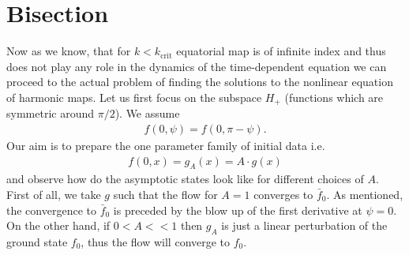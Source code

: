\section*{Bisection}

Now as we know, that for $k<k_{\text{crit}}$ equatorial map is of infinite
index and thus does not play any role in the dynamics of the
time-dependent equation we can proceed to the actual problem of
finding the solutions to the nonlinear equation of harmonic maps. Let
us first focus on the subspace $H_+$ (functions which are symmetric around
$\pi/2$). We assume
\begin{align}
  f(0,\psi)=f(0,\pi-\psi).
\end{align}
Our aim is to prepare the one parameter family of initial data i.e.
\begin{align}
  f(0,x)=g_A(x)=A\cdot g(x)
\end{align}
and observe how do the asymptotic states look like for different
choices of $A$. First of all, we take $g$ such that the flow for $A=1$
converges to $\bar{f}_0$. As mentioned, the convergence to $\bar{f}_0$
is preceded by the blow up of the first derivative at $\psi=0$.  On
the other hand, if $0<A<<1$ then $g_A$ is just a linear perturbation
of the ground state $f_0$, thus the flow will converge to
$f_0$.



